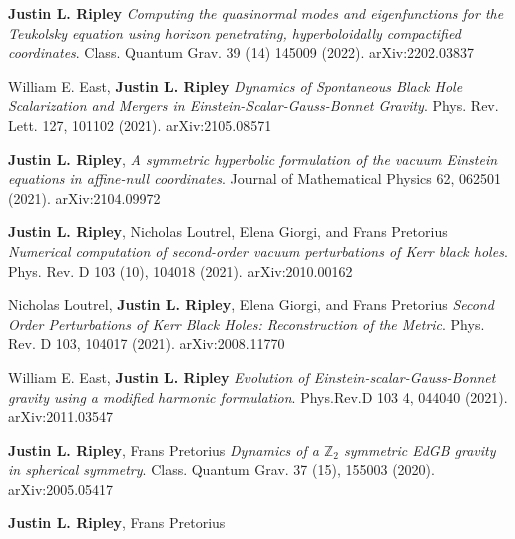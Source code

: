 \documentclass{my_cv}
\begin{document}
\begin{etaremune}
\item {\bf Justin L. Ripley} 
   \emph{Computing the quasinormal modes and eigenfunctions for the 
   Teukolsky equation using horizon penetrating, 
   hyperboloidally compactified coordinates}.
   Class. Quantum Grav. 39 (14) 145009 (2022).
   arXiv:2202.03837
\item William E. East, {\bf Justin L. Ripley} 
   \emph{Dynamics of Spontaneous Black Hole Scalarization and Mergers
   in Einstein-Scalar-Gauss-Bonnet Gravity}.
   Phys. Rev. Lett. 127, 101102 (2021).
   arXiv:2105.08571
\item {\bf Justin L. Ripley}, 
   \emph{A symmetric hyperbolic formulation of the vacuum
      Einstein equations in affine-null coordinates}.
   Journal of Mathematical Physics 62, 062501 (2021).
   arXiv:2104.09972
\item {\bf Justin L. Ripley}, 
   Nicholas Loutrel, Elena Giorgi, and Frans Pretorius 
   \emph{Numerical computation of second-order vacuum perturbations of
      Kerr black holes}.
   Phys. Rev. D 103 (10), 104018 (2021). 
   arXiv:2010.00162
\item Nicholas Loutrel, {\bf Justin L. Ripley}, 
   Elena Giorgi, and Frans Pretorius 
   \emph{Second Order Perturbations of Kerr Black Holes: Reconstruction of
      the Metric}.
   Phys. Rev. D 103, 104017 (2021).
   arXiv:2008.11770
\item William E. East, {\bf Justin L. Ripley} 
   \emph{Evolution of Einstein-scalar-Gauss-Bonnet gravity
      using a modified harmonic formulation}.
   Phys.Rev.D 103 4, 044040 (2021).
   arXiv:2011.03547
\item {\bf Justin L. Ripley}, Frans Pretorius 
   \emph{Dynamics of a $\mathbb{Z}_2$ symmetric EdGB gravity in
      spherical symmetry}.
   Class. Quantum Grav. 37 (15), 155003 (2020).
   arXiv:2005.05417
\item {\bf Justin L. Ripley}, Frans Pretorius 

\end{etaremune}
\end{document}
